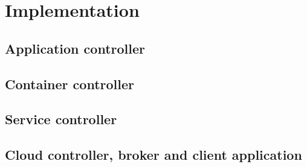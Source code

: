 \chapter{Implementation}


\section{Application controller}
\section{Container controller}
\section{Service controller}
\section{Cloud controller, broker and client application}

